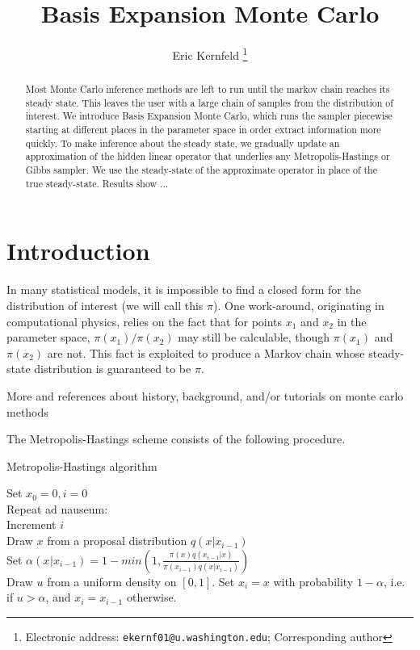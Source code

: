 \documentclass{article}
\begin{document}
\title{Basis Expansion Monte Carlo}

\author{Eric Kernfeld
  \thanks{Electronic address: \texttt{ekernf01@u.washington.edu}; Corresponding author}}
\maketitle

\begin{abstract}
Most Monte Carlo inference methods are left to run until the markov chain reaches its steady state. This leaves the user with a large chain of samples from the distribution of interest. We introduce Basis Expansion Monte Carlo, which runs the sampler piecewise starting at different places in the parameter space in order extract information more quickly. To make inference about the steady state, we gradually update an approximation of the hidden linear operator that underlies any Metropolis-Hastings or Gibbs sampler. We use the steady-state of the approximate operator in place of the true steady-state. Results show ...
\end{abstract}


\section{Introduction}
In many statistical models, it is impossible to find a closed form for the distribution of interest (we will call this $\pi$). One work-around, originating in computational physics, relies on the fact that for points $x_1$ and $x_2$ in the parameter space, $\pi(x_1)/\pi(x_2)$ may still be calculable, though $\pi(x_1)$ and $\pi(x_2)$ are not. This fact is exploited to produce a Markov chain whose steady-state distribution is guaranteed to be $\pi$.

More and references about history, background, and/or tutorials on monte carlo methods

The Metropolis-Hastings scheme consists of the following procedure.

\begin{algorithm}[h]
\caption{Metropolis-Hastings algorithm}
Set $x_0 = 0, i=0$\\
Repeat ad nauseum:\\
\Indp
Increment $i$\\
Draw $x$ from a proposal distribution $q(x|x_{i-1})$\\
Set $\alpha(x_{}|x_{i-1}) = 1 - min(1, \frac{\pi(x)q(x_{i-1}|x)}{\pi(x_{i-1})q(x|x_{i-1})})$\\
Draw $u$ from a uniform density on $[0,1]$.
Set $x_i = x$ with probability $1 - \alpha$, i.e. if $u >\alpha$, and $x_i = x_{i-1}$ otherwise.\\
\end{algorithm}
\end{document}
